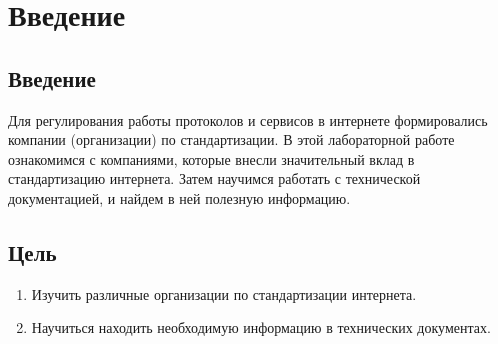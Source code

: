 \chapter{Введение}
\label{ch:intro}

\section{Введение}

Для регулирования работы протоколов и сервисов в интернете формировались компании
(организации) по стандартизации. В этой лабораторной работе ознакомимся с компаниями,
которые внесли значительный вклад в стандартизацию интернета. Затем научимся работать с
технической документацией, и найдем в ней полезную информацию.

\section{Цель}  

\begin{enumerate}
    \item Изучить различные организации по стандартизации интернета.
    \item Научиться находить необходимую информацию в технических документах.
\end{enumerate}

\endinput